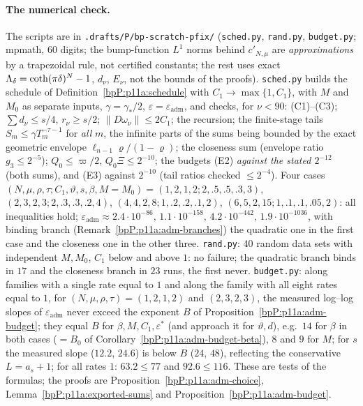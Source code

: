 \paragraph{The numerical check.} The scripts are in \texttt{.drafts/P/bp-scratch-pfix/} (\texttt{sched.py}, \texttt{rand.py}, \texttt{budget.py}; mpmath, 60 digits; the bump-function $L^1$ norms behind $c'_{N,\mu}$ are \emph{approximations} by a trapezoidal rule, not certified constants; the rest uses exact $\Lambda_{\delta}=\coth(\pi\delta)^N-1$, $d_\nu$, $E_\nu$, not the bounds of the proofs). \texttt{sched.py} builds the schedule of Definition~\ref{bpP:p11a:schedule} with $C_1\to\max\{1,C_1\}$, with $M$ and $M_0$ as separate inputs, $\gamma=\gamma_*/2$, $\varepsilon=\varepsilon_{\mathrm{adm}}$, and checks, for $\nu<90$: (C1)--(C3); $\sum d_\nu\le s/4$, $r_\nu\ge s/2$; $\lVert D\omega_\nu\rVert\le2C_1$; the recursion; the finite-stage tails $S_m\le\gamma T_m^{-\tau-1}$ for \emph{all} $m$, the infinite parts of the sums being bounded by the exact geometric envelope $\ell_{n-1}\varrho/(1-\varrho)$; the closeness sum (envelope ratio $g_3\le2^{-5}$); $Q_0\le\varpi/2$, $Q_0\Xi\le2^{-10}$; the budgets (E2) \emph{against the stated $2^{-12}$} (both sums), and (E3) against $2^{-10}$ (tail ratios checked $\le2^{-4}$). Four cases $(N,\mu,\rho,\tau;C_1,\vartheta,s,\beta,M{=}M_0)=(1,2,1,2;2,.5,.5,.3,3)$, $(2,3,2,3;2,.3,.3,.2,4)$, $(4,4,2,8;1,.2,.2,.1,2)$, $(6,5,2,15;1,.1,.1,.05,2)$: all inequalities hold; $\varepsilon_{\mathrm{adm}}\approx2.4\cdot10^{-86},\,1.1\cdot10^{-158},\,4.2\cdot10^{-442},\,1.9\cdot10^{-1036}$, with binding branch (Remark~\ref{bpP:p11a:adm-branches}) the quadratic one in the first case and the closeness one in the other three. \texttt{rand.py}: $40$ random data sets with independent $M,M_0$, $C_1$ below and above $1$: no failure; the quadratic branch binds in $17$ and the closeness branch in $23$ runs, the first never. \texttt{budget.py}: along families with a single rate equal to $1$ and along the family with all eight rates equal to $1$, for $(N,\mu,\rho,\tau)=(1,2,1,2)$ and $(2,3,2,3)$, the measured log--log slopes of $\varepsilon_{\mathrm{adm}}$ never exceed the exponent $B$ of Proposition~\ref{bpP:p11a:adm-budget}; they equal $B$ for $\beta,M,C_1,\varepsilon^*$ (and approach it for $\vartheta,d$), e.g.\ $14$ for $\beta$ in both cases ($=B_0$ of Corollary~\ref{bpP:p11a:adm-budget-beta}), $8$ and $9$ for $M$; for $s$ the measured slope ($12.2$, $24.6$) is below $B$ ($24$, $48$), reflecting the conservative $L=a_s+1$; for all rates $1$: $63.2\le77$ and $92.6\le116$. These are tests of the formulas; the proofs are Proposition~\ref{bpP:p11a:adm-choice}, Lemma~\ref{bpP:p11a:exported-sums} and Proposition~\ref{bpP:p11a:adm-budget}.

